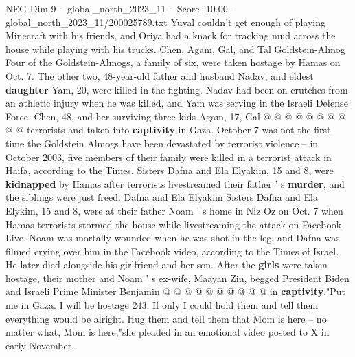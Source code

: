 \begin{textsample}{NEG Dim 9 – global\_north\_2023\_11 – Score -10.00 – global\_north\_2023\_11/200025789.txt}
Yuval couldn't get enough of playing Minecraft with his friends, and Oriya had a knack for tracking mud across the house while playing with his trucks.
Chen, Agam, Gal, and Tal Goldstein-Almog Four of the Goldstein-Almogs, a family of six, were taken hostage by Hamas on Oct. 7.
The other two, 48-year-old father and husband Nadav, and eldest \textbf{daughter} Yam, 20, were killed in the fighting.
Nadav had been on crutches from an athletic injury when he was killed, and Yam was serving in the Israeli Defense Force.
Chen, 48, and her surviving three kids Agam, 17, Gal @ @ @ @ @ @ @ @ @ @ terrorists and taken into \textbf{captivity} in Gaza.
October 7 was not the first time the Goldstein Almogs have been devastated by terrorist violence -- in October 2003, five members of their family were killed in a terrorist attack in Haifa, according to the Times.
Sisters Dafna and Ela Elyakim, 15 and 8, were \textbf{kidnapped} by Hamas after terrorists livestreamed their father ' s \textbf{murder}, and the siblings were just freed.
Dafna and Ela Elyakim Sisters Dafna and Ela Elykim, 15 and 8, were at their father Noam ' s home in Niz Oz on Oct. 7 when Hamas terrorists stormed the house while livestreaming the attack on Facebook Live.
Noam was mortally wounded when he was shot in the leg, and Dafna was filmed crying over him in the Facebook video, according to the Times of Israel.
He later died alongside his girlfriend and her son.
After the \textbf{girls} were taken hostage, their mother and Noam ' s ex-wife, Maayan Zin, begged President Biden and Israeli Prime Minister Benjamin @ @ @ @ @ @ @ @ @ @ in \textbf{captivity}."Put me in Gaza.
I will be hostage 243.
If only I could hold them and tell them everything would be alright.
Hug them and tell them that Mom is here -- no matter what, Mom is here,"she pleaded in an emotional video posted to X in early November.

\end{textsample}
